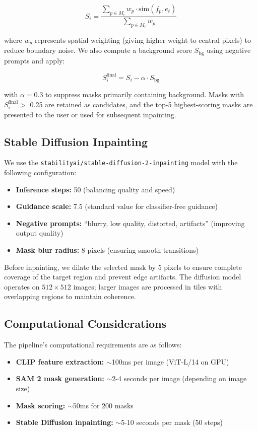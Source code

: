 \begin{equation}
S_i = \frac{\sum_{p \in M_i} w_p \cdot \text{sim}(f_p, e_t)}{\sum_{p \in M_i} w_p}
\end{equation}

where $w_p$ represents spatial weighting (giving higher weight to central pixels) to reduce boundary noise. We also compute a background score $S_{\text{bg}}$ using negative prompts and apply:

\begin{equation}
S_i^{\text{final}} = S_i - \alpha \cdot S_{\text{bg}}
\end{equation}

with $\alpha = 0.3$ to suppress masks primarily containing background. Masks with $S_i^{\text{final}} >$ 0.25 are retained as candidates, and the top-5 highest-scoring masks are presented to the user or used for subsequent inpainting.

\subsection{Stable Diffusion Inpainting}

We use the \texttt{stabilityai/stable-diffusion-2-inpainting} model with the following configuration:

\begin{itemize}
    \item \textbf{Inference steps:} 50 (balancing quality and speed)
    \item \textbf{Guidance scale:} 7.5 (standard value for classifier-free guidance)
    \item \textbf{Negative prompts:} ``blurry, low quality, distorted, artifacts'' (improving output quality)
    \item \textbf{Mask blur radius:} 8 pixels (ensuring smooth transitions)
\end{itemize}

Before inpainting, we dilate the selected mask by 5 pixels to ensure complete coverage of the target region and prevent edge artifacts. The diffusion model operates on $512 \times 512$ images; larger images are processed in tiles with overlapping regions to maintain coherence.

\subsection{Computational Considerations}

The pipeline's computational requirements are as follows:
\begin{itemize}
    \item \textbf{CLIP feature extraction:} $\sim$100ms per image (ViT-L/14 on GPU)
    \item \textbf{SAM 2 mask generation:} $\sim$2-4 seconds per image (depending on image size)
    \item \textbf{Mask scoring:} $\sim$50ms for 200 masks
    \item \textbf{Stable Diffusion inpainting:} $\sim$5-10 seconds per mask (50 steps)
\end{itemize}


